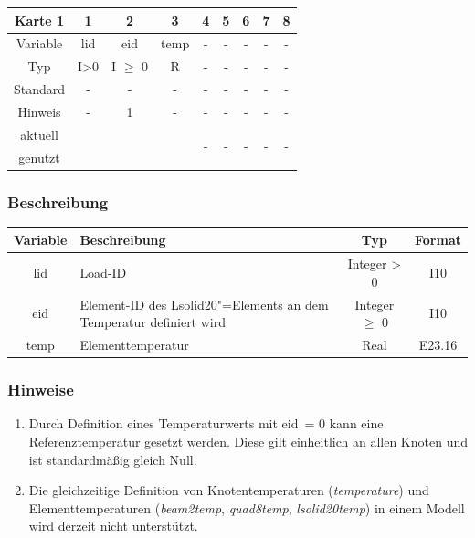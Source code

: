 \documentclass[11pt,titlepage,listof=totoc,bibliography=totoc,twoside]{scrreprt}
\begin{document}
{{\begin{table}[htbp]
\centering
\begin{tabularx}{\textwidth}{cCCCCCCCC}
\toprule
Karte 1         & 1     & 2          & 3          & 4  & 5  & 6  & 7  & 8  \\
\midrule
Variable        & lid   & eid        & temp       & -  & -  & -  & -  & -  \\
Typ             & I>0   & I $\geq$ 0 & R          & -  & -  & -  & -  & -  \\
Standard        & -     & -          & -          & -  & -  & -  & -  & -  \\
Hinweis         & -     & 1          & -          & -  & -  & -  & -  & -  \\
aktuell         &  &  &  &   &   &   &   &   \\
genutzt \\
\bottomrule
\end{tabularx}
\end{table}

\subsubsection{Beschreibung}

\begin{tabularx}{\textwidth}{cXcc}
\toprule
Variable  & Beschreibung  & Typ          & Format  \\
\midrule
lid       & Load-ID       & Integer > 0  & I10     \\
eid       & Element-ID des Lsolid20"=Elements an dem Temperatur definiert wird & Integer $\geq$ 0 & I10  \\
temp      & Elementtemperatur & Real      & E23.16  \\
\bottomrule
\end{tabularx}

\subsubsection{Hinweise}

\begin{enumerate}
 \item Durch Definition eines Temperaturwerts mit eid~= 0 kann eine Referenztemperatur gesetzt werden. Diese gilt einheitlich an allen Knoten und ist standardmäßig gleich Null.
 \item Die gleichzeitige Definition von Knotentemperaturen (\emph{temperature}) und Elementtemperaturen (\emph{beam2temp}, \emph{quad8temp}, \emph{lsolid20temp}) in einem Modell wird derzeit nicht unterstützt.
\end{enumerate}

}}
\end{document}
